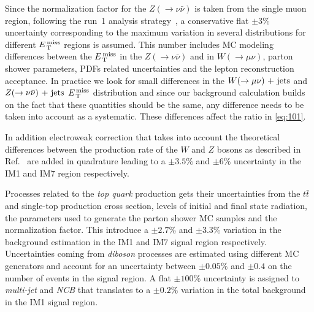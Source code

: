 Since the normalization factor for the $Z(\rightarrow \nu \bar{\nu})$ is taken
from the single muon region, following the run~1 analysis
strategy~\cite{RunIPaper}, a conservative flat $\pm 3\%$ uncertainty
corresponding to the maximum variation in several distributions for different
$E_\mathrm{\, T}^\mathrm{\, miss}$ regions is assumed. This number includes MC modeling differences between
the $E_\mathrm{\, T}^\mathrm{\, miss}$ in the $Z(\rightarrow \nu \bar{\nu})$ and in
$W(\rightarrow \mu \nu)$, parton shower parameters, PDFs related uncertainties
and the lepton reconstruction acceptance. In practice we look for small
differences in the $W (\rightarrow \mu \nu)\mathrm{~+~jets}$ and $Z (\rightarrow \nu \bar{\nu})\mathrm{~+~jets}$ $E_\mathrm{\, T}^\mathrm{\, miss}$ distribution and
since our background calculation builds on the fact that these quantities should
be the same, any difference needs to be taken into account as a
systematic. These differences affect the ratio in \cref{eq:101}.

In addition electroweak correction that takes into account the theoretical
differences between the production rate of the $W$ and $Z$ bosons as described
in Ref.~\cite{EWCorrections} are added in quadrature leading to a $\pm 3.5\%$
and $\pm 6\%$ uncertainty in the IM1 and IM7 region respectively.

Processes related to the \emph{top quark} production gets their uncertainties
from the $t \bar{t}$ and single-top production cross section, levels of initial
and final state radiation, the parameters used to generate the parton shower MC
samples and the normalization factor. This introduce a $\pm 2.7\%$ and
$\pm 3.3 \%$ variation in the background estimation in the IM1 and IM7 signal
region respectively. Uncertainties coming from \emph{diboson} processes are
estimated using different MC generators and account for an uncertainty between
$\pm 0.05\%$ and $\pm 0.4$ on the number of events in the signal region. A flat
$\pm 100\%$ uncertainty is assigned to \emph{multi-jet} and \emph{NCB} that
translates to a $\pm 0.2\%$ variation in the total background in the IM1 signal
region.
